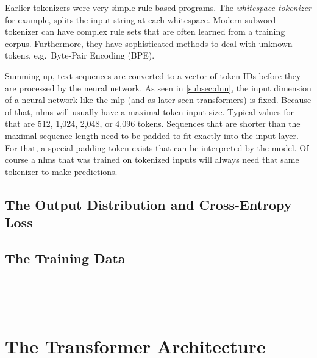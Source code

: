 Earlier tokenizers were very simple rule-based programs.
The \textit{whitespace tokenizer} for example, splits the input string at each whitespace.
Modern subword tokenizer can have complex rule sets that are often learned from a training corpus.
Furthermore, they have sophisticated methods to deal with unknown tokens, e.g.\ Byte-Pair Encoding (BPE).

Summing up, text sequences are converted to a vector of token IDs before they are processed by the neural network.
As seen in \autoref{subsec:dnn}, the input dimension of a neural network like the \gls{mlp} (and as later seen transformers) is fixed.
Because of that, \glspl{nlm} will usually have a maximal token input size.
Typical values for that are 512, 1,024, 2,048, or 4,096 tokens.
Sequences that are shorter than the maximal sequence length need to be padded to fit exactly into the input layer.
For that, a special padding token exists that can be interpreted by the model.
Of course a \glspl{nlm} that was trained on tokenized inputs will always need that same tokenizer to make predictions.



\subsection{The Output Distribution and Cross-Entropy Loss}\label{subsec:the-output-distribution---cross-entropy-loss}

\subsection{The Training Data}\label{subsec:the-training-data}

~\autocite{transformer2022}

~\autocite{transformer2024}


\section{The Transformer Architecture}\label{sec:the-transformer-architecture}





